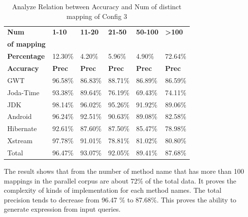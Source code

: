 \begin{table}[]
\tiny
\centering
\caption{Analyze Relation between Accuracy and Num of distinct mapping of Config 3}
\begin{tabular}{|l|l|l|l|l|l|}
\hline
              
\textbf{Num }& \textbf{1-10}        & \textbf{11-20}       & \textbf{21-50}       & \textbf{50-100}      & \textbf{\textgreater{}100}     \\
\textbf{of mapping }&         &        &        &       &      \\ \hline
\textbf{Percentage  }   & 12.30\%     & 4.20\%      & 5.96\%      & 4.90\%      & 72.64\%               \\ \hline
\textbf{Accuracy }      & \textbf{Prec}        & \textbf{Prec}        & \textbf{Prec}        & \textbf{Prec}        & \textbf{Prec}                  \\ \hline
GWT            & 96.58\%     & 86.83\%     & 88.71\%     & 86.89\%     & 86.59\%               \\ \hline
Joda-Time      & 93.38\%     & 89.64\%     & 76.19\%     & 69.43\%     & 74.11\%               \\ \hline
JDK            & 98.14\%     & 96.02\%     & 95.26\%     & 91.92\%     & 89.06\%               \\ \hline
Android        & 96.24\%     & 92.51\%     & 90.63\%     & 89.08\%     & 82.58\%               \\ \hline
Hibernate      & 92.61\%     & 87.60\%     & 87.50\%     & 85.47\%     & 78.98\%               \\ \hline
Xstream        & 97.78\%     & 91.01\%     & 78.81\%     & 81.02\%     & 80.80\%               \\ \hline
Total          & 96.47\%     & 93.07\%     & 92.05\%     & 89.41\%     & 87.68\%               \\ \hline
\end{tabular}

\label{tbl:Analyze1}
\end{table}
The result shows that from the number of method name that has more than 100 mappings in the parallel corpus are about 72\% of the total data. It proves the complexity of kinds of implementation for each method names. The total precision tends to decrease from 96.47 \% to 87.68\%. This proves the ability to generate expression from input queries.





